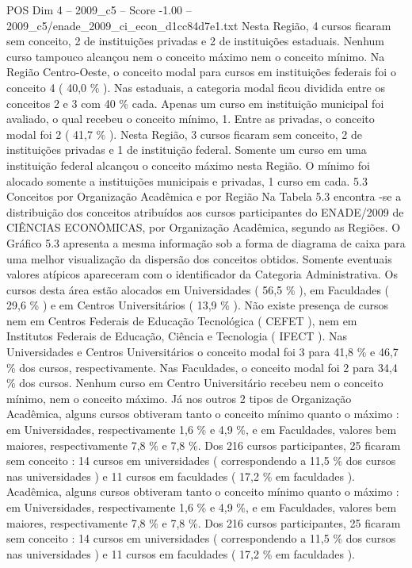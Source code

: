 \begin{textsample}{POS Dim 4 – 2009\_c5 – Score -1.00 – 2009\_c5/enade\_2009\_ci\_econ\_d1cc84d7e1.txt}
Nesta Região, 4 cursos ficaram sem conceito, 2 de instituições privadas e 2 de instituições estaduais.
Nenhum curso tampouco alcançou nem o conceito máximo nem o conceito mínimo.
Na Região Centro-Oeste, o conceito modal para cursos em instituições federais foi o conceito 4 ( 40,0 \% ).
Nas estaduais, a categoria modal ficou dividida entre os conceitos 2 e 3 com 40 \% cada.
Apenas um curso em instituição municipal foi avaliado, o qual recebeu o conceito mínimo, 1.
Entre as privadas, o conceito modal foi 2 ( 41,7 \% ).
Nesta Região, 3 cursos ficaram sem conceito, 2 de instituições privadas e 1 de instituição federal.
Somente um curso em uma instituição federal alcançou o conceito máximo nesta Região.
O mínimo foi alocado somente a instituições municipais e privadas, 1 curso em cada. 5.3 Conceitos por Organização Acadêmica e por Região Na Tabela 5.3 encontra -se a distribuição dos conceitos atribuídos aos cursos participantes do ENADE/2009 de CIÊNCIAS ECONÔMICAS, por Organização Acadêmica, segundo as Regiões.
O Gráfico 5.3 apresenta a mesma informação sob a forma de diagrama de caixa para uma melhor visualização da dispersão dos conceitos obtidos.
Somente eventuais valores atípicos apareceram com o identificador da Categoria Administrativa.
Os cursos desta área estão alocados em Universidades ( 56,5 \% ), em Faculdades ( 29,6 \% ) e em Centros Universitários ( 13,9 \% ).
Não existe presença de cursos nem em Centros Federais de Educação Tecnológica ( CEFET ), nem em Institutos Federais de Educação, Ciência e Tecnologia ( IFECT ).
Nas Universidades e Centros Universitários o conceito modal foi 3 para 41,8 \% e 46,7 \% dos cursos, respectivamente.
Nas Faculdades, o conceito modal foi 2 para 34,4 \% dos cursos.
Nenhum curso em Centro Universitário recebeu nem o conceito mínimo, nem o conceito máximo.
Já nos outros 2 tipos de Organização Acadêmica, alguns cursos obtiveram tanto o conceito mínimo quanto o máximo : em Universidades, respectivamente 1,6 \% e 4,9 \%, e em Faculdades, valores bem maiores, respectivamente 7,8 \% e 7,8 \%.
Dos 216 cursos participantes, 25 ficaram sem conceito : 14 cursos em universidades ( correspondendo a 11,5 \% dos cursos nas universidades ) e 11 cursos em faculdades ( 17,2 \% em faculdades ).
Acadêmica, alguns cursos obtiveram tanto o conceito mínimo quanto o máximo : em Universidades, respectivamente 1,6 \% e 4,9 \%, e em Faculdades, valores bem maiores, respectivamente 7,8 \% e 7,8 \%.
Dos 216 cursos participantes, 25 ficaram sem conceito : 14 cursos em universidades ( correspondendo a 11,5 \% dos cursos nas universidades ) e 11 cursos em faculdades ( 17,2 \% em faculdades ).

\end{textsample}
